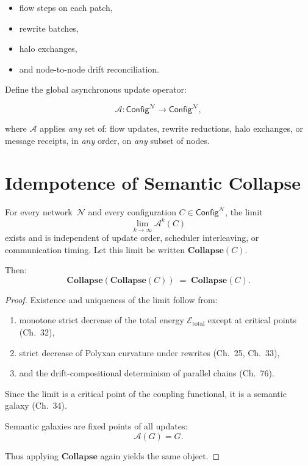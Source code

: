\begin{itemize}
\item flow steps on each patch,
\item rewrite batches,
\item halo exchanges,
\item and node-to-node drift reconciliation.
\end{itemize}

Define the global asynchronous update operator:

\[
\mathcal{A} : \mathsf{Config}^{\mathcal{N}}
  \longrightarrow \mathsf{Config}^{\mathcal{N}},
\]

where $\mathcal{A}$ applies \emph{any} set of:
flow updates, rewrite reductions, halo exchanges, or message receipts,
in \emph{any} order, on \emph{any} subset of nodes.


\section{Idempotence of Semantic Collapse}

\begin{theorem}
\label{thm:async-idempotence}
For every network~$\mathcal{N}$ and every configuration
$C \in \mathsf{Config}^{\mathcal{N}}$,
the limit
\[
\lim_{k\to\infty} \mathcal{A}^k(C)
\]
exists and is independent of update order, scheduler interleaving,
or communication timing.  
Let this limit be written $\mathbf{Collapse}(C)$.

Then:
\[
\mathbf{Collapse}(\mathbf{Collapse}(C)) \;=\; \mathbf{Collapse}(C).
\]
\end{theorem}

\begin{proof}
Existence and uniqueness of the limit follow from:
\begin{enumerate}
\item monotone strict decrease of the total energy
      $\mathcal{E}_{\mathrm{total}}$ except at critical points
      (Ch.~32),
\item strict decrease of Polyxan curvature under rewrites
      (Ch.~25, Ch.~33),
\item and the drift-compositional determinism of parallel chains
      (Ch.~76).
\end{enumerate}

Since the limit is a critical point of the coupling functional,
it is a semantic galaxy (Ch.~34).

Semantic galaxies are fixed points of all updates:
\[
\mathcal{A}(G) = G.
\]

Thus applying $\mathbf{Collapse}$ again yields the same object.
\end{proof}

